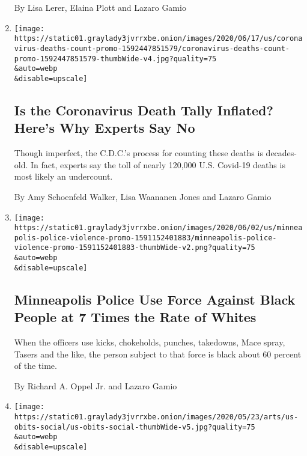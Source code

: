 \begin{enumerate}
  By Lisa Lerer, Elaina Plott and Lazaro Gamio
\item
  \href{/interactive/2020/06/19/us/us-coronavirus-covid-death-toll.html}{}

  \texttt{[image: https://static01.graylady3jvrrxbe.onion/images/2020/06/17/us/coronavirus-deaths-count-promo-1592447851579/coronavirus-deaths-count-promo-1592447851579-thumbWide-v4.jpg?quality=75\\\&auto=webp\\\&disable=upscale]}

  \hypertarget{is-the-coronavirus-death-tally-inflated-heres-why-experts-say-no}{%
  \subsection{Is the Coronavirus Death Tally Inflated? Here's Why
  Experts Say
  No}\label{is-the-coronavirus-death-tally-inflated-heres-why-experts-say-no}}

  Though imperfect, the C.D.C.'s process for counting these deaths is
  decades-old. In fact, experts say the toll of nearly 120,000 U.S.
  Covid-19 deaths is most likely an undercount.

  By Amy Schoenfeld Walker, Lisa Waananen Jones and Lazaro Gamio
\item
  \href{/interactive/2020/06/03/us/minneapolis-police-use-of-force.html}{}

  \texttt{[image: https://static01.graylady3jvrrxbe.onion/images/2020/06/02/us/minneapolis-police-violence-promo-1591152401883/minneapolis-police-violence-promo-1591152401883-thumbWide-v2.png?quality=75\\\&auto=webp\\\&disable=upscale]}

  \hypertarget{minneapolis-police-use-force-against-black-people-at-7-times-the-rate-of-whites}{%
  \subsection{Minneapolis Police Use Force Against Black People at 7
  Times the Rate of
  Whites}\label{minneapolis-police-use-force-against-black-people-at-7-times-the-rate-of-whites}}

  When the officers use kicks, chokeholds, punches, takedowns, Mace
  spray, Tasers and the like, the person subject to that force is black
  about 60 percent of the time.

  By Richard A. Oppel Jr. and Lazaro Gamio
\item
  \href{/es/2020/05/26/espanol/mundo/100000-victimas-covid-estados-unidos.html}{}

  \texttt{[image: https://static01.graylady3jvrrxbe.onion/images/2020/05/23/arts/us-obits-social/us-obits-social-thumbWide-v5.jpg?quality=75\\\&auto=webp\\\&disable=upscale]}


\end{enumerate}
